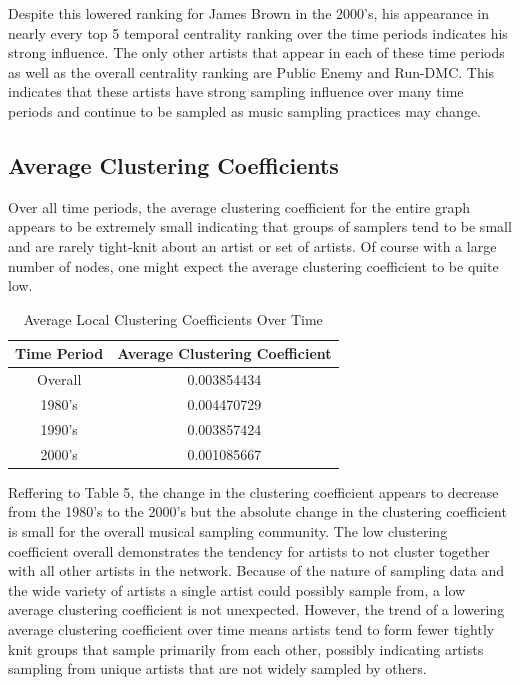 \documentclass[pageno]{jpaper}
\begin{document}
Despite this lowered ranking for James Brown in the 2000's, his appearance in nearly every top 5 temporal centrality ranking over the time periods indicates his strong influence. The only other artists that appear in each of these time periods as well as the overall centrality ranking are Public Enemy and Run-DMC. This indicates that these artists have strong sampling influence over many time periods and continue to be sampled as music sampling practices may change.
\subsection{Average Clustering Coefficients}
Over all time periods, the average clustering coefficient for the entire graph appears to be extremely small indicating that groups of samplers tend to be small and are rarely tight-knit about an artist or set of artists. Of course with a large number of nodes, one might expect the average clustering coefficient to be quite low.
\begin{table}[H]
\centering
\begin{tabular}{|c|c|}
\hline
\textbf{Time Period} & \textbf{Average Clustering Coefficient} \\ \hline
Overall & 0.003854434 \\ \hline
1980's & 0.004470729 \\ \hline
1990's & 0.003857424 \\ \hline
2000's & 0.001085667 \\ \hline
\end{tabular}
\caption{Average Local Clustering Coefficients Over Time}
\label{table:table5}
\end{table}
Reffering to Table 5, the change in the clustering coefficient appears to decrease from the 1980's to the 2000's but the absolute change in the clustering coefficient is small for the overall musical sampling community. The low clustering coefficient overall demonstrates the tendency for artists to not cluster together with all other artists in the network. Because of the nature of sampling data and the wide variety of artists a single artist could possibly sample from, a low average clustering coefficient is not unexpected. However, the trend of a lowering average clustering coefficient over time means artists tend to form fewer tightly knit groups that sample primarily from each other, possibly indicating artists sampling from unique artists that are not widely sampled by others.
\end{document}
